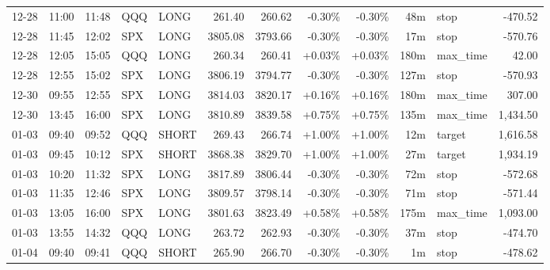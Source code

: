 \documentclass[11pt,a4paper]{article}
\begin{document}
\begin{center}
\begin{longtable}{>{\color{txtmain}}l l l l l r r r r r >{\color{txtmain}}l r}
12-28 & 11:00 & 11:48 & QQQ & LONG & 261.40 & 260.62 & \textcolor{lossred}{-0.30\%} & \textcolor{lossred}{-0.30\%} & 48m & stop & \textcolor{lossred}{-470.52} \\
12-28 & 11:45 & 12:02 & SPX & LONG & 3805.08 & 3793.66 & \textcolor{lossred}{-0.30\%} & \textcolor{lossred}{-0.30\%} & 17m & stop & \textcolor{lossred}{-570.76} \\
12-28 & 12:05 & 15:05 & QQQ & LONG & 260.34 & 260.41 & \textcolor{wingreen}{+0.03\%} & \textcolor{wingreen}{+0.03\%} & 180m & max\_time & \textcolor{wingreen}{42.00} \\
12-28 & 12:55 & 15:02 & SPX & LONG & 3806.19 & 3794.77 & \textcolor{lossred}{-0.30\%} & \textcolor{lossred}{-0.30\%} & 127m & stop & \textcolor{lossred}{-570.93} \\
12-30 & 09:55 & 12:55 & SPX & LONG & 3814.03 & 3820.17 & \textcolor{wingreen}{+0.16\%} & \textcolor{wingreen}{+0.16\%} & 180m & max\_time & \textcolor{wingreen}{307.00} \\
12-30 & 13:45 & 16:00 & SPX & LONG & 3810.89 & 3839.58 & \textcolor{wingreen}{+0.75\%} & \textcolor{wingreen}{+0.75\%} & 135m & max\_time & \textcolor{wingreen}{1,434.50} \\
01-03 & 09:40 & 09:52 & QQQ & SHORT & 269.43 & 266.74 & \textcolor{wingreen}{+1.00\%} & \textcolor{wingreen}{+1.00\%} & 12m & target & \textcolor{wingreen}{1,616.58} \\
01-03 & 09:45 & 10:12 & SPX & SHORT & 3868.38 & 3829.70 & \textcolor{wingreen}{+1.00\%} & \textcolor{wingreen}{+1.00\%} & 27m & target & \textcolor{wingreen}{1,934.19} \\
01-03 & 10:20 & 11:32 & SPX & LONG & 3817.89 & 3806.44 & \textcolor{lossred}{-0.30\%} & \textcolor{lossred}{-0.30\%} & 72m & stop & \textcolor{lossred}{-572.68} \\
01-03 & 11:35 & 12:46 & SPX & LONG & 3809.57 & 3798.14 & \textcolor{lossred}{-0.30\%} & \textcolor{lossred}{-0.30\%} & 71m & stop & \textcolor{lossred}{-571.44} \\
01-03 & 13:05 & 16:00 & SPX & LONG & 3801.63 & 3823.49 & \textcolor{wingreen}{+0.58\%} & \textcolor{wingreen}{+0.58\%} & 175m & max\_time & \textcolor{wingreen}{1,093.00} \\
01-03 & 13:55 & 14:32 & QQQ & LONG & 263.72 & 262.93 & \textcolor{lossred}{-0.30\%} & \textcolor{lossred}{-0.30\%} & 37m & stop & \textcolor{lossred}{-474.70} \\
01-04 & 09:40 & 09:41 & QQQ & SHORT & 265.90 & 266.70 & \textcolor{lossred}{-0.30\%} & \textcolor{lossred}{-0.30\%} & 1m & stop & \textcolor{lossred}{-478.62} \\

\end{longtable}
\end{center}
\end{document}
